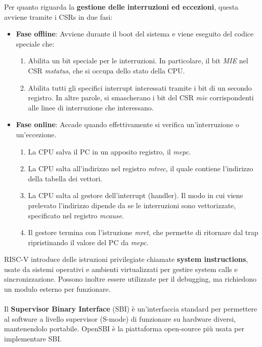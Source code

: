 Per quanto riguarda la \textbf{gestione delle interruzioni ed eccezioni}, questa avviene tramite i CSRs in due fasi:
\begin{itemize}
	\item \textbf{Fase offline}: Avviene durante il boot del sistema e viene eseguito del codice speciale che: 
	\begin{enumerate}
		\item Abilita un bit speciale per le interruzioni. In particolare, il bit \textit{MIE} nel CSR \textit{mstatus}, che si occupa dello stato della CPU.
		\item Abilita tutti gli specifici interrupt interessati tramite i bit di un secondo registro. In altre parole, si smascherano i bit del CSR \textit{mie} corrispondenti alle linee di interruzione che interessano.
	\end{enumerate}
	\item \textbf{Fase online}: Accade quando effettivamente si verifica un'interruzione o un’eccezione.
	\begin{enumerate}
		\item La CPU salva il PC in un apposito registro, il \textit{mepc}.
		\item La CPU salta all’indirizzo nel registro \textit{mtvec}, il quale contiene l’indirizzo della tabella dei vettori.
		\item La CPU salta al gestore dell’interrupt (handler). Il modo in cui viene prelevato l'indirizzo dipende da se le interruzioni sono vettorizzate, specificato nel registro \textit{mcause}.
		\item Il gestore termina con l’istruzione \textit{mret}, che permette di ritornare dal trap 
		ripristinando il valore del PC da \textit{mepc}.
	\end{enumerate}
\end{itemize}
RISC-V introduce delle istruzioni privilegiate chiamate \textbf{system instructions}, usate da sistemi operativi e ambienti virtualizzati per gestire system calls e sincronizzazione. Possono inoltre essere utilizzate per il debugging, ma richiedono un modulo esterno per funzionare.
\\
\\
Il \textbf{Supervisor Binary Interface} (SBI) è un'interfaccia standard per permettere al software a livello supervisor (S-mode) di funzionare su hardware diversi, mantenendolo portabile. OpenSBI è la piattaforma open-source più usata per implementare SBI.

